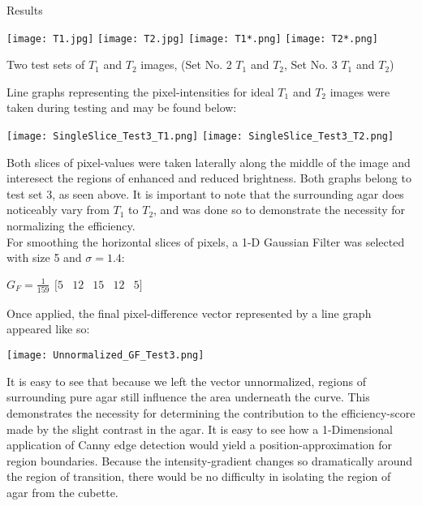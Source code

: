 \documentclass[a4paper,12pt]{article}
\begin{document}
\begin{section}{Results}
\begin{center}
\texttt{[image: T1.jpg]}
\texttt{[image: T2.jpg]}
\texttt{[image: T1*.png]}
\texttt{[image: T2*.png]}
\end{center}
\begin{center}
\small{Two test sets of $T_1$ and $T_2$ images, (Set No. 2 $T_1$ and $T_2$, Set No. 3 $T_1$ and $T_2$)}
\end{center}

Line graphs representing the pixel-intensities for ideal $T_1$ and $T_2$ images were taken during testing and may be found below:

\begin{center}
\texttt{[image: SingleSlice\_Test3\_T1.png]}
\texttt{[image: SingleSlice\_Test3\_T2.png]}
\end{center}

Both slices of pixel-values were taken laterally along the middle of the image and interesect the regions of enhanced and reduced brightness. Both graphs belong to test set 3, as seen above. It is important to note that the surrounding agar does noticeably vary from $T_1$ to $T_2$, and was done so to demonstrate the necessity for normalizing the efficiency.\\

For smoothing the horizontal slices of pixels, a 1-D Gaussian Filter was selected with size 5 and $\sigma = 1.4$:

\begin{center}
$G_F = \frac{1}{159}
\begin{matrix}
[ 5 & 12 & 15 & 12 & 5 ]
\end{matrix}$
\end{center}
	
Once applied, the final pixel-difference vector represented by a line graph appeared like so:

\begin{center}
\texttt{[image: Unnormalized\_GF\_Test3.png]}
\end{center}

It is easy to see that because we left the vector unnormalized, regions of surrounding pure agar still influence the area underneath the curve. This demonstrates the necessity for determining the contribution to the efficiency-score made by the slight contrast in the agar. It is easy to see how a 1-Dimensional application of Canny edge detection would yield a position-approximation for region boundaries. Because the intensity-gradient changes so dramatically around the region of transition, there would be no difficulty in isolating the region of agar from the cubette.

\end{section}
\end{document}
